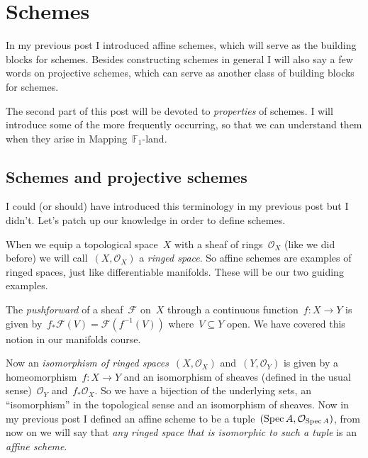\section{Schemes}

In my previous post I introduced affine schemes, which will serve as the building blocks for schemes. Besides constructing schemes in general I will also say a few words on projective schemes, which can serve as another class of building blocks for schemes.

The second part of this post will be devoted to \emph{properties} of schemes. I will introduce some of the more frequently occurring, so that we can understand them when they arise in \iftex\cite{mapping-fun}\fi\ifblog Mapping~$\mathbb{F}_1$-land\fi.

\subsection{Schemes and projective schemes}
I could (or should) have introduced this terminology in my previous post but I didn't. Let's patch up our knowledge in order to define schemes.

\begin{definition}
  When we equip a topological space~$X$ with a sheaf of rings~$\mathcal{O}_X$ (like we did before) we will call~$(X,\mathcal{O}_X)$ a \emph{ringed space}. So affine schemes are examples of ringed spaces, just like differentiable manifolds. These will be our two guiding examples.
\end{definition}

\begin{definition}
  The \emph{pushforward} of a sheaf~$\mathcal{F}$ on~$X$ through a continuous function~$f\colon X\to Y$ is given by~$f_\ast\mathcal{F}(V)=\mathcal{F}(f^{-1}(V))$ where~$V\subseteq Y$ open. We have covered this notion in our manifolds course.
\end{definition}

\begin{definition}
  Now an \emph{isomorphism of ringed spaces}~$(X,\mathcal{O}_X)$ and~$(Y,\mathcal{O}_Y)$ is given by a homeomorphism~$f\colon X\to Y$ and an isomorphism of sheaves (defined in the usual sense)~$\mathcal{O}_Y$ and~$f_\ast\mathcal{O}_X$. So we have a bijection of the underlying sets, an ``isomorphism'' in the topological sense and an isomorphism of sheaves. Now in my previous post I defined an affine scheme to be a tuple~$(\operatorname{Spec} A,\mathcal{O}_{\operatorname{Spec} A})$, from now on we will say that \emph{any ringed space that is isomorphic to such a tuple} is an \emph{affine scheme}.
\end{definition}

